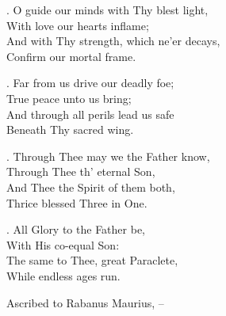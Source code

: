 {{. O guide our minds with Thy blest light,\\
With love our hearts inflame;\\
And with Thy strength, which ne'er decays,\\
Confirm our mortal frame.

. Far from us drive our deadly foe;\\
True peace unto us bring;\\
And through all perils lead us safe\\
Beneath Thy sacred wing.

. Through Thee may we the Father know,\\
Through Thee th' eternal Son,\\
And Thee the Spirit of them both,\\
Thrice blessed Three in One.

. All Glory to the Father be,\\
With His co-equal Son:\\
The same to Thee, great Paraclete,\\
While endless ages run.

}
}

\endlyrics

\bigskip

\source Ascribed to Rabanus Maurius, {}--



%

